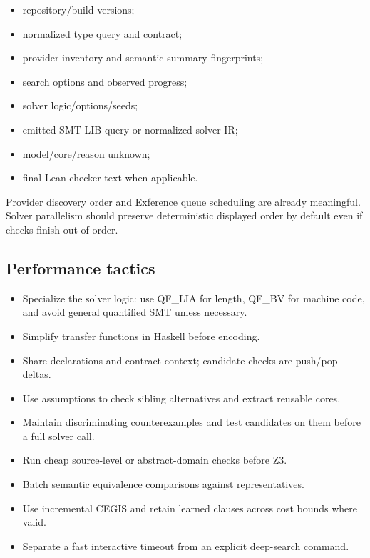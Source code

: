 \documentclass[11pt,oneside]{article}
\begin{document}
\begin{itemize}
  \item repository/build versions;
  \item normalized type query and contract;
  \item provider inventory and semantic summary fingerprints;
  \item search options and observed progress;
  \item solver logic/options/seeds;
  \item emitted SMT-LIB query or normalized solver IR;
  \item model/core/reason unknown;
  \item final Lean checker text when applicable.
\end{itemize}

Provider discovery order and Exference queue scheduling are already meaningful. Solver
parallelism should preserve deterministic displayed order by default even if checks
finish out of order.

\subsection{Performance tactics}

\begin{itemize}
  \item Specialize the solver logic: use QF\_LIA for length, QF\_BV for machine code,
        and avoid general quantified SMT unless necessary.
  \item Simplify transfer functions in Haskell before encoding.
  \item Share declarations and contract context; candidate checks are push/pop deltas.
  \item Use assumptions to check sibling alternatives and extract reusable cores.
  \item Maintain discriminating counterexamples and test candidates on them before a
        full solver call.
  \item Run cheap source-level or abstract-domain checks before Z3.
  \item Batch semantic equivalence comparisons against representatives.
  \item Use incremental CEGIS and retain learned clauses across cost bounds where valid.
  \item Separate a fast interactive timeout from an explicit deep-search command.
\end{itemize}
\end{document}
